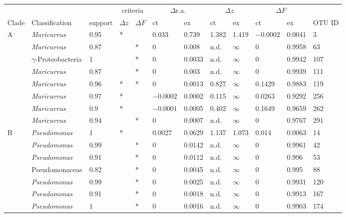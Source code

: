 \clearpage
\begin{landscape}
\begin{table}
\centering
\begin{tabular}{*{12}{l}}
\toprule
 &  &  & \multicolumn{2}{c}{criteria} & \multicolumn{2}{c}{$\Delta\mathrm{r.a.}$} & \multicolumn{2}{c}{$\Delta z$} & \multicolumn{2}{c}{$\Delta F$} &  \\
\cmidrule(r){4-5} \cmidrule(r){6-7} \cmidrule(r){8-9} \cmidrule(r){10-11}
Clade & Classification & support & $\Delta z$ & $\Delta F$ & ct & ex & ct & ex & ct & ex & OTU ID \\
\midrule
A & \textit{Maricurvus} & 0.95 & * &  & 0.033 & 0.739 & 1.382 & 1.419 & $-0.0002$ & 0.0041 & 3 \\
 & \textit{Maricurvus} & 0.87 &  & * & 0 & 0.008 & n.d. & $\infty$ & 0 & 0.9958 & 63 \\
 & $\gamma$-Proteobacteria & 1 &  & * & 0 & 0.0033 & n.d. & $\infty$ & 0 & 0.9942 & 107 \\
 & \textit{Maricurvus} & 0.87 &  & * & 0 & 0.003 & n.d. & $\infty$ & 0 & 0.9939 & 111 \\
 & \textit{Maricurvus} & 0.96 & * & * & 0 & 0.0013 & 0.827 & $\infty$ & 0.1429 & 0.9883 & 119 \\
 & \textit{Maricurvus} & 0.97 & * &  & $-0.0002$ & 0.0002 & 0.115 & $\infty$ & 0.0263 & 0.9292 & 256 \\
 & \textit{Maricurvus} & 0.9 & * &  & $-0.0001$ & 0.0005 & 0.402 & $\infty$ & 0.1649 & 0.9659 & 262 \\
 & \textit{Maricurvus} & 0.94 &  & * & 0 & 0.0007 & n.d. & $\infty$ & 0 & 0.9767 & 291 \\
B & \textit{Pseudomonas} & 1 & * &  & 0.0027 & 0.0629 & 1.137 & 1.073 & 0.014 & 0.0063 & 14 \\
 & \textit{Pseudomonas} & 0.99 &  & * & 0 & 0.0142 & n.d. & $\infty$ & 0 & 0.9961 & 42 \\
 & \textit{Pseudomonas} & 0.91 &  & * & 0 & 0.0112 & n.d. & $\infty$ & 0 & 0.996 & 53 \\
 & Pseudomonaceae & 0.82 &  & * & 0 & 0.0045 & n.d. & $\infty$ & 0 & 0.995 & 88 \\
 & \textit{Pseudomonas} & 0.99 &  & * & 0 & 0.0025 & n.d. & $\infty$ & 0 & 0.9931 & 120 \\
 & \textit{Pseudomonas} & 0.91 &  & * & 0 & 0.0018 & n.d. & $\infty$ & 0 & 0.9913 & 167 \\
 & \textit{Pseudomonas} & 1 &  & * & 0 & 0.0016 & n.d. & $\infty$ & 0 & 0.9903 & 174 \\

\end{tabular}
\end{table}
\end{landscape}
